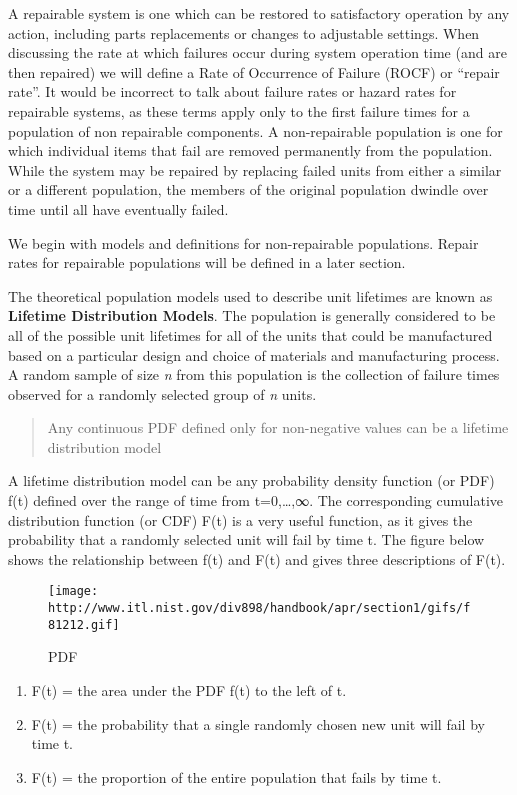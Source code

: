 \documentclass[]{book}
\providecommand{\tightlist}{%
  \setlength{\itemsep}{0pt}\setlength{\parskip}{0pt}}
\theoremstyle{definition}
\theoremstyle{definition}
\theoremstyle{definition}
\theoremstyle{remark}
\begin{document}
A repairable system is one which can be restored to satisfactory
operation by any action, including parts replacements or changes to
adjustable settings. When discussing the rate at which failures occur
during system operation time (and are then repaired) we will define a
Rate of Occurrence of Failure (ROCF) or ``repair rate''. It would be
incorrect to talk about failure rates or hazard rates for repairable
systems, as these terms apply only to the first failure times for a
population of non repairable components. A non-repairable population is
one for which individual items that fail are removed permanently from
the population. While the system may be repaired by replacing failed
units from either a similar or a different population, the members of
the original population dwindle over time until all have eventually
failed.

We begin with models and definitions for non-repairable populations.
Repair rates for repairable populations will be defined in a later
section.

The theoretical population models used to describe unit lifetimes are
known as \textbf{Lifetime Distribution Models}. The population is
generally considered to be all of the possible unit lifetimes for all of
the units that could be manufactured based on a particular design and
choice of materials and manufacturing process. A random sample of size
\emph{n} from this population is the collection of failure times
observed for a randomly selected group of \emph{n} units.

\begin{quote}
Any continuous PDF defined only for non-negative values can be a
lifetime distribution model
\end{quote}

A lifetime distribution model can be any probability density function
(or PDF) f(t) defined over the range of time from t=0,\ldots{},∞. The
corresponding cumulative distribution function (or CDF) F(t) is a very
useful function, as it gives the probability that a randomly selected
unit will fail by time t. The figure below shows the relationship
between f(t) and F(t) and gives three descriptions of F(t).

\begin{figure}
\centering
\texttt{[image: http://www.itl.nist.gov/div898/handbook/apr/section1/gifs/f81212.gif]}
\caption{PDF}
\end{figure}

\begin{enumerate}
\def\labelenumi{\arabic{enumi}.}
\tightlist
\item
  F(t) = the area under the PDF f(t) to the left of t.
\item
  F(t) = the probability that a single randomly chosen new unit will
  fail by time t.
\item
  F(t) = the proportion of the entire population that fails by time t.
\end{enumerate}
\end{document}
